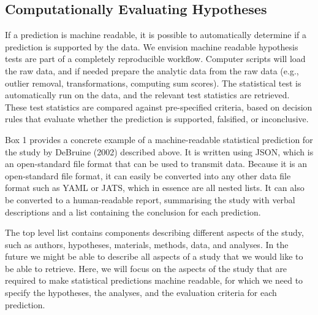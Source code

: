 \documentclass[doc,floatsintext]{apa6}
\begin{document}
\hypertarget{computationally-evaluating-hypotheses}{%
\subsection{Computationally Evaluating Hypotheses}\label{computationally-evaluating-hypotheses}}

If a prediction is machine readable, it is possible to automatically determine if a prediction is supported by the data. We envision machine readable hypothesis tests are part of a completely reproducible workflow. Computer scripts will load the raw data, and if needed prepare the analytic data from the raw data (e.g., outlier removal, transformations, computing sum scores). The statistical test is automatically run on the data, and the relevant test statistics are retrieved. These test statistics are compared against pre-specified criteria, based on decision rules that evaluate whether the prediction is supported, falsified, or inconclusive.

Box 1 provides a concrete example of a machine-readable statistical prediction for the study by DeBruine (2002) described above. It is written using JSON, which is an open-standard file format that can be used to transmit data. Because it is an open-standard file format, it can easily be converted into any other data file format such as YAML or JATS, which in essence are all nested lists. It can also be converted to a human-readable report, summarising the study with verbal descriptions and a list containing the conclusion for each prediction.

The top level list contains components describing different aspects of the study, such as authors, hypotheses, materials, methods, data, and analyses. In the future we might be able to describe all aspects of a study that we would like to be able to retrieve. Here, we will focus on the aspects of the study that are required to make statistical predictions machine readable, for which we need to specify the hypotheses, the analyses, and the evaluation criteria for each prediction.
\end{document}
